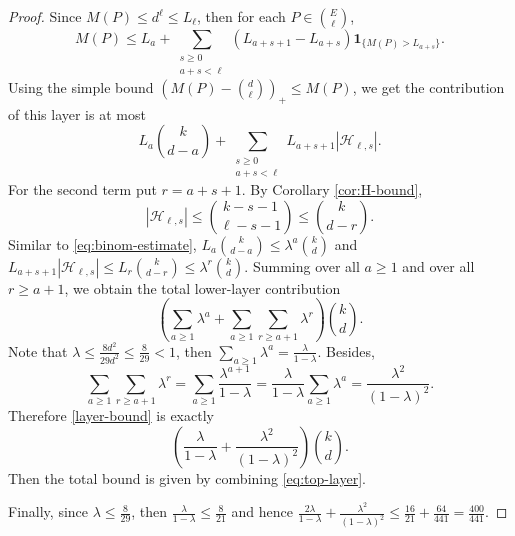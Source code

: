 \documentclass[10pt,a4paper]{amsart}
\begin{document}
\begin{proof}
 Since $M(P)\le d^\ell\le L_\ell$, then
		for each $P\in\binom{E}{\ell}$,
		\[
		M(P)
		\le
		L_a+
		\sum_{\substack{s\ge 0\\ a+s<\ell}}
		(L_{a+s+1}-L_{a+s})\mathbf 1_{\{M(P)>L_{a+s}\}}.
		\]
		Using the simple bound $\left(M(P)-\binom{d}{\ell}\right)_+\le M(P)$, we get the contribution of this layer is at most
		\[
		L_a\binom{k}{d-a}
		+
		\sum_{\substack{s\ge 0\\ a+s<\ell}}
		L_{a+s+1}|\mathcal H_{\ell,s}|.
		\]
	For the second term put
		$
		r=a+s+1.
		$
		By Corollary \ref{cor:H-bound},
		\[
		|\mathcal H_{\ell,s}|
		\le
		\binom{k-s-1}{\ell-s-1}\le \binom{k}{d-r}.
		\]
		Similar to \eqref{eq:binom-estimate},
		$
		L_a\binom{k}{d-a}
		\le
		\lambda^a\binom{k}{d}
		$
		 and $
		L_{a+s+1}|\mathcal H_{\ell,s}|
		\le
		L_r\binom{k}{d-r}
		\le
		\lambda^r\binom{k}{d}.
		$
		Summing over all $a\ge 1$ and over all $r\ge a+1$, we obtain the total lower-layer contribution
		\begin{equation}\label{layer-bound}
		\left(
		\sum_{a\ge 1}\lambda^a
		+
		\sum_{a\ge 1}\sum_{r\ge a+1}\lambda^r
		\right)
		\binom{k}{d}.
		\end{equation}
		Note that $\lambda\le\frac{8d^2}{29d^2}\le\frac{8}{29}<1$, then $\sum\limits_{a\ge 1}\lambda^a=\frac{\lambda}{1-\lambda}$. Besides, $$\sum_{a\ge 1}\sum_{r\ge a+1}\lambda^r=\sum_{a\ge 1}{\frac{\lambda^{a+1}}{1-\lambda}}=\frac{\lambda}{1-\lambda}\sum\limits_{a\ge 1}\lambda^a=\frac{\lambda^2}{(1-\lambda)^2}.$$
		Therefore \eqref{layer-bound} is exactly
		\[
		\left(
		\frac{\lambda}{1-\lambda}
		+
		\frac{\lambda^2}{(1-\lambda)^2}
		\right)
		\binom{k}{d}.
		\]
		Then the total bound is given by combining \eqref{eq:top-layer}.
		
		Finally, since $\lambda\le\frac{8}{29}$,
		then
		$
		\frac{\lambda}{1-\lambda}\le \frac{8}{21}
		$
		and hence
		$
		\frac{2\lambda}{1-\lambda}
		+
		\frac{\lambda^2}{(1-\lambda)^2}
		\le
		\frac{16}{21}+\frac{64}{441}
		=
		\frac{400}{441}.
		$
	\end{proof}
\end{document}
